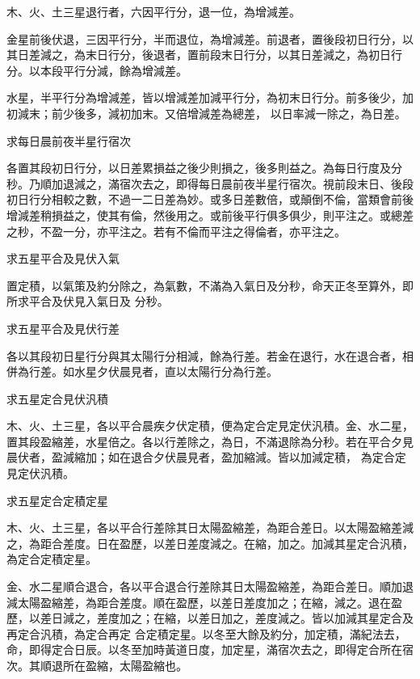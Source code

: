 \begin{pinyinscope}
 木、火、土三星退行者，六因平行分，退一位，為增減差。



 金星前後伏退，三因平行分，半而退位，為增減差。前退者，置後段初日行分，以其日差減之，為末日行分，後退者，置前段末日行分，以其日差減之，為初日行分。以本段平行分減，餘為增減差。



 水星，半平行分為增減差，皆以增減差加減平行分，為初末日行分。前多後少，加初減末；前少後多，減初加末。又倍增減差為總差，
 以日率減一除之，為日差。



 求每日晨前夜半星行宿次



 各置其段初日行分，以日差累損益之後少則損之，後多則益之。為每日行度及分秒。乃順加退減之，滿宿次去之，即得每日晨前夜半星行宿次。視前段末日、後段初日行分相較之數，不過一二日差為妙。或多日差數倍，或顛倒不倫，當類會前後增減差稍損益之，使其有倫，然後用之。或前後平行俱多俱少，則平注之。或總差之秒，不盈一分，亦平注之。若有不倫而平注之得倫者，亦平注之。



 求五星平合及見伏入氣



 置定積，以氣策及約分除之，為氣數，不滿為入氣日及分秒，命天正冬至算外，即所求平合及伏見入氣日及
 分秒。



 求五星平合及見伏行差



 各以其段初日星行分與其太陽行分相減，餘為行差。若金在退行，水在退合者，相併為行差。如水星夕伏晨見者，直以太陽行分為行差。



 求五星定合見伏汎積



 木、火、土三星，各以平合晨疾夕伏定積，便為定合定見定伏汎積。金、水二星，置其段盈縮差，水星倍之。各以行差除之，為日，不滿退除為分秒。若在平合夕見晨伏者，盈減縮加；如在退合夕伏晨見者，盈加縮減。皆以加減定積，
 為定合定見定伏汎積。



 求五星定合定積定星



 木、火、土三星，各以平合行差除其日太陽盈縮差，為距合差日。以太陽盈縮差減之，為距合差度。日在盈歷，以差日差度減之。在縮，加之。加減其星定合汎積，為定合定積定星。



 金、水二星順合退合，各以平合退合行差除其日太陽盈縮差，為距合差日。順加退減太陽盈縮差，為距合差度。順在盈歷，以差日差度加之；在縮，減之。退在盈歷，以差日減之，差度加之；在縮，以差日加之，差度減之。皆以加減其星定合及再定合汎積，為定合再定
 合定積定星。以冬至大餘及約分，加定積，滿紀法去，命，即得定合日辰。以冬至加時黃道日度，加定星，滿宿次去之，即得定合所在宿次。其順退所在盈縮，太陽盈縮也。




\end{pinyinscope}
